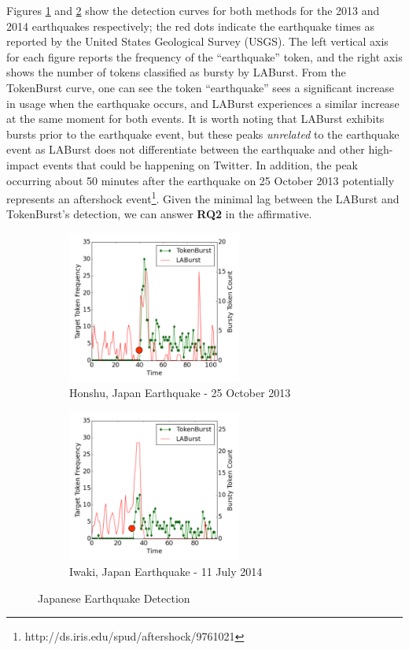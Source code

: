 \documentclass[letterpaper]{article}
\begin{document}
Figures \ref{fig:2013Japan} and \ref{fig:2014Japan} show the detection curves for both methods for the 2013 and 2014 earthquakes respectively; the red dots indicate the earthquake times as reported by the United States Geological Survey (USGS).
The left vertical axis for each figure reports the frequency of the ``earthquake'' token, and the right axis shows the number of tokens classified as bursty by LABurst.
From the TokenBurst curve, one can see the token ``earthquake'' sees a significant increase in usage when the earthquake occurs, and LABurst experiences a similar increase at the same moment for both events.
It is worth noting that LABurst exhibits bursts prior to the earthquake event, but these peaks \emph{unrelated} to the earthquake event as LABurst does not differentiate between the earthquake and other high-impact events that could be happening on Twitter. 
In addition, the peak occurring about 50 minutes after the earthquake on 25 October 2013 potentially represents an aftershock event\footnote{http://ds.iris.edu/spud/aftershock/9761021}.
Given the minimal lag between the LABurst and TokenBurst's detection, we can answer \textbf{RQ2} in the affirmative. 

\begin{figure}[btp]
\centering
\begin{subfigure}[b]{0.4\textwidth}
\includegraphics[width=2.25in]{./figures/2013-japan-quake.png}
\caption{Honshu, Japan Earthquake - 25 October 2013}
\label{fig:2013Japan}
\end{subfigure}
\begin{subfigure}[b]{0.4\textwidth}
\includegraphics[width=2.25in]{./figures/2014-japan-quake.png}
\caption{Iwaki, Japan Earthquake - 11 July 2014}
\label{fig:2014Japan}
\end{subfigure}
\caption{Japanese Earthquake Detection}
\label{fig:joinedEarthquake}
\end{figure}
\end{document}
